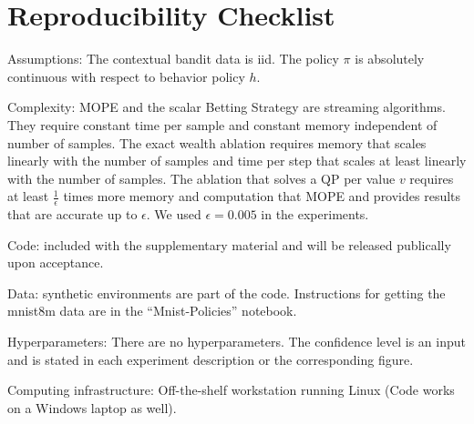 \section{Reproducibility Checklist}
\begin{description}
\item Assumptions: The contextual bandit data is iid. 
The policy $\pi$ is absolutely 
continuous with respect to behavior policy $h$.
\item Complexity: MOPE and the scalar Betting Strategy are streaming algorithms. They require constant time per sample and constant memory
independent of number of samples. The exact wealth ablation requires
memory that scales linearly with the number of samples and time 
per step that scales at least linearly with the number of samples.
The ablation that solves a QP per value $v$ requires at least $\frac{1}{\epsilon}$ 
times more memory and computation that MOPE and provides 
results that are accurate up to $\epsilon$. We used 
$\epsilon=0.005$ in the experiments.
\item Code: included with the supplementary material and 
will be released publically upon acceptance.
\item Data: synthetic environments are part of the code.
Instructions for getting the mnist8m data are in the 
``Mnist-Policies'' notebook.
\item Hyperparameters: There are no hyperparameters.
The confidence level is an input and is stated in each experiment
description or the corresponding figure.
\item Computing infrastructure: Off-the-shelf workstation running Linux
(Code works on a Windows laptop as well).
\end{description}
 